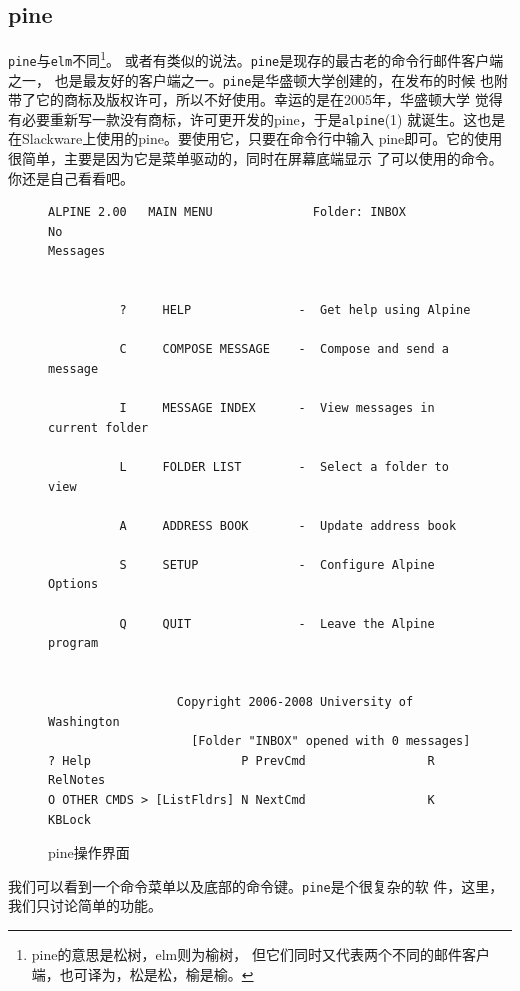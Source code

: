 \subsection{pine}
\label{chap:basicNetworkCommands:email:pine}
\texttt{pine}与\texttt{elm}不同\footnote{pine的意思是松树，elm则为榆树，
  但它们同时又代表两个不同的邮件客户端，也可译为，松是松，榆是榆。}。
或者有类似的说法。\texttt{pine}是现存的最古老的命令行邮件客户端之一，
也是最友好的客户端之一。\texttt{pine}是华盛顿大学创建的，在发布的时候
也附带了它的商标及版权许可，所以不好使用。幸运的是在2005年，华盛顿大学
觉得有必要重新写一款没有商标，许可更开发的pine，于是\texttt{alpine}(1)
就诞生。这也是在Slackware上使用的pine。要使用它，只要在命令行中输入
pine即可。它的使用很简单，主要是因为它是菜单驱动的，同时在屏幕底端显示
了可以使用的命令。你还是自己看看吧。
\begin{figure}[htpb]
  \centering
  
\begin{Verbatim}[frame=single, commandchars=\\\{\}]
  ALPINE 2.00   MAIN MENU              Folder: INBOX               No
Messages  


          ?     HELP               -  Get help using Alpine           

          C     COMPOSE MESSAGE    -  Compose and send a message      

          I     MESSAGE INDEX      -  View messages in current folder 

          L     FOLDER LIST        -  Select a folder to view         

          A     ADDRESS BOOK       -  Update address book             

          S     SETUP              -  Configure Alpine Options        

          Q     QUIT               -  Leave the Alpine program        


                  Copyright 2006-2008 University of Washington
                    [Folder "INBOX" opened with 0 messages]
? Help                     P PrevCmd                 R RelNotes                 
O OTHER CMDS > [ListFldrs] N NextCmd                 K KBLock    
\end{Verbatim}

  \caption{pine操作界面}
  \label{fig:pine}
\end{figure}

我们可以看到一个命令菜单以及底部的命令键。\texttt{pine}是个很复杂的软
件，这里，我们只讨论简单的功能。

